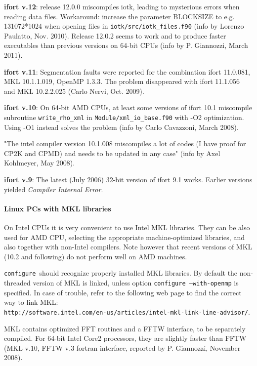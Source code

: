 \documentclass[12pt,a4paper]{article}
\def\configure{\texttt{configure}}
\begin{document}
{\bf ifort v.12}: release 12.0.0 miscompiles iotk, leading to 
mysterious errors when reading data files. Workaround: increase 
the parameter BLOCKSIZE to e.g. 131072*1024 when opening files in 
\texttt{iotk/src/iotk\_files.f90} (info by Lorenzo Paulatto,
Nov. 2010). Release 12.0.2 seems to work and to produce faster executables
than previous versions on 64-bit CPUs (info by P. Giannozzi, March 2011).

{\bf ifort v.11}: Segmentation faults were reported for the combination 
ifort 11.0.081, MKL 10.1.1.019, OpenMP 1.3.3. The problem disappeared
with ifort 11.1.056 and MKL 10.2.2.025 (Carlo Nervi, Oct. 2009).

{\bf ifort v.10}: On 64-bit AMD CPUs, at least some versions of ifort 10.1 
miscompile subroutine \texttt{write\_rho\_xml} in 
\texttt{Module/xml\_io\_base.f90} with -O2
optimization. Using -O1 instead solves the problem (info by Carlo
Cavazzoni, March 2008). 

"The intel compiler version 10.1.008 miscompiles a lot of codes (I have proof 
for CP2K and CPMD) and needs to be updated in any case" (info by Axel
Kohlmeyer, May 2008).
 
{\bf ifort v.9}: The latest (July 2006) 32-bit version of ifort 9.1
works. Earlier versions yielded {\em Compiler Internal Error}.
    
\paragraph{Linux PCs with MKL libraries}
On Intel CPUs it is very convenient to use Intel MKL libraries. They can be
also used for AMD CPU, selecting the appropriate machine-optimized
libraries, and also together with non-Intel compilers. Note however
that recent versions of MKL (10.2 and following) do not perform
well on AMD machines.

\configure\ should recognize properly installed MKL libraries.
By default the non-threaded version of MKL is linked, unless option
\texttt{configure --with-openmp} is specified. In case of trouble,
refer to the following web page to find the correct way to link MKL:\\
\texttt{http://software.intel.com/en-us/articles/intel-mkl-link-line-advisor/}.

MKL contains optimized FFT routines and a FFTW interface, to be separately
compiled. For 64-bit Intel Core2 processors, they are slightly faster than 
FFTW (MKL v.10, FFTW v.3 fortran interface, reported by P. Giannozzi,
November 2008). 
\end{document}
